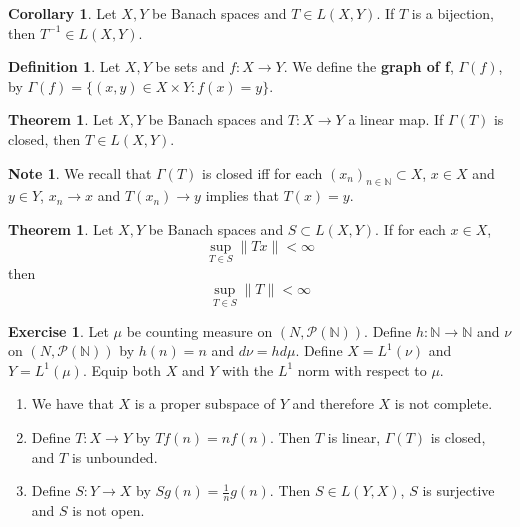 \documentclass[12pt]{amsart}
\theoremstyle{definition}
\newtheorem{defn}[definition]{Definition}
\newtheorem{note}[definition]{Note}
\newtheorem{thm}[definition]{Theorem}
\newtheorem{cor}[definition]{Corollary}
\newtheorem{ex}[definition]{Exercise}
\newcommand{\Gam}{\Gamma}
\newcommand{\N}{\mathbb{N}}
\newcommand{\MP}{\mathcal{P}}
\newcommand{\conv}[1]{\xrightarrow{#1}}
\begin{document}
	\begin{cor}
		Let $X, Y$ be Banach spaces and $T \in L(X,Y)$. If $T$ is a bijection, then $T^{-1} \in L(X,Y)$.
	\end{cor}
	
	\begin{defn}
		Let $X,Y$ be sets and $f:X \rightarrow Y$. We define the \textbf{graph of f}, $\Gam(f)$, by $\Gam(f) = \{(x,y) \in X \times Y: f(x) = y\}$.
	\end{defn}
	
	\begin{thm}
		Let $X, Y$ be Banach spaces and $T:X \rightarrow Y$ a linear map. If $\Gam(T)$ is closed, then $T \in L(X,Y)$.  
	\end{thm}
	
	\begin{note}
		We recall that $\Gam(T)$ is closed iff for each $(x_n)_{n \in \N} \subset X$, $x \in X$ and $y \in Y$, $x_n \conv{} x$ and $T(x_n) \conv{} y$ implies that $T(x) = y$. 
	\end{note}
	
	\begin{thm}
		
		Let $X, Y$ be Banach spaces and $S \subset L(X,Y)$. If for each $x \in X$, $$\sup_{T \in S} \|Tx \|< \infty$$ then $$\sup_{T \in S} \|T \|< \infty$$
	\end{thm}
	
	\begin{ex}
		Let $\mu$ be counting measure on $(N, \MP(\N))$. Define $h: \N \rightarrow \N$ and $ \nu$ on $(N, \MP(\N))$ by $h(n) = n$ and $d \nu = h d \mu$. Define $X=L^1(\nu)$ and $Y = L^1(\mu)$. Equip both $X$ and $Y$ with the $L^1$ norm with respect to $\mu$. 
		\begin{enumerate}
			\item We have that $X$ is a proper subspace of $Y$ and therefore $X$ is not complete.
			\item Define $T: X \rightarrow Y$ by $Tf(n) = nf(n)$. Then $T$ is linear, $\Gam(T)$ is closed, and $T$ is unbounded.
			\item Define $S:Y \rightarrow X$ by $Sg(n) = \frac{1}{n}g(n)$. Then $S \in L(Y,X)$, $S$ is surjective and $S$ is not open. 
		\end{enumerate}
	\end{ex}
	
\end{document}
